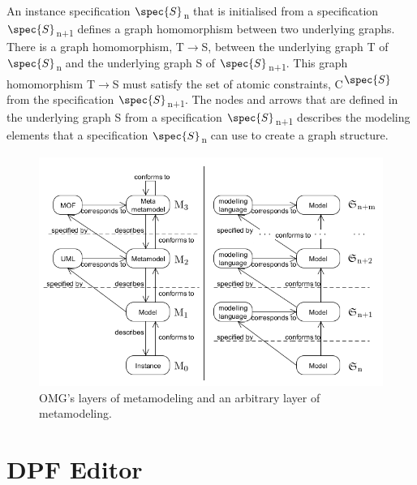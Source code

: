 An instance specification $\spec{S}$\textsubscript{n} that is initialised from
a specification $\spec{S}$\textsubscript{n+1} defines a graph homomorphism
between two underlying graphs. There is a graph homomorphism,
T$\longrightarrow$S, between the underlying graph T of
$\spec{S}$\textsubscript{n} and the underlying graph S of
$\spec{S}$\textsubscript{n+1}\cite{Lamo2013}. This graph homomorphism
T$\longrightarrow$S must satisfy the set of atomic constraints,
C\textsuperscript{$\spec{S}$} from the specification
$\spec{S}$\textsubscript{n+1}. The nodes and arrows that are defined in the
underlying graph S from a specification $\spec{S}$\textsubscript{n+1} describes
the modeling elements that a specification $\spec{S}$\textsubscript{n} can use
to create a graph structure.

\begin{figure}[H]
	\centering
	\includegraphics[scale=0.7]{./Figures/MOF_vs_DPF}
	\caption[OMG's layers of metamodeling and multilayer modeling]
	{OMG's layers of metamodeling and an arbitrary layer of metamodeling.}
	\label{fig:MOF_vs_DPF}
\end{figure}



 
\section{DPF Editor}

